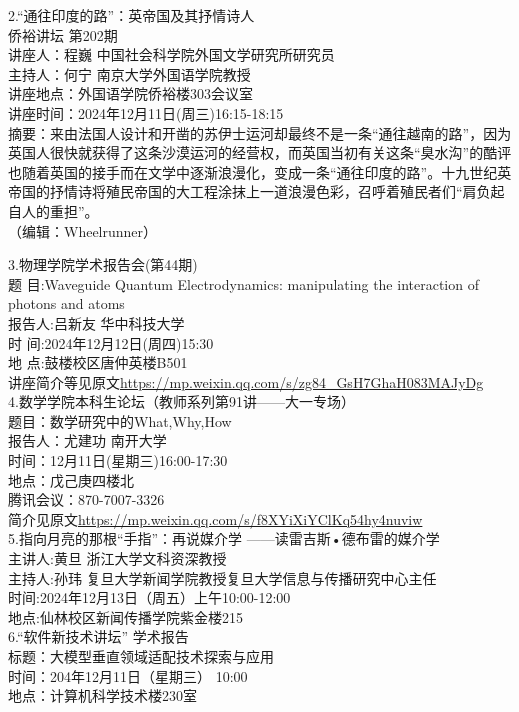 \documentclass[letterpaper, 12pt]{article}
\begin{document}
\begin{multicols}{2}
2.“通往印度的路”：英帝国及其抒情诗人\\
侨裕讲坛 第202期\\
讲座人：程巍 中国社会科学院外国文学研究所研究员\\
主持人：何宁 南京大学外国语学院教授\\
讲座地点：外国语学院侨裕楼303会议室\\
讲座时间：2024年12月11日(周三)16:15-18:15\\
摘要：来由法国人设计和开凿的苏伊士运河却最终不是一条“通往越南的路”，因为英国人很快就获得了这条沙漠运河的经营权，而英国当初有关这条“臭水沟”的酷评也随着英国的接手而在文学中逐渐浪漫化，变成一条“通往印度的路”。十九世纪英帝国的抒情诗将殖民帝国的大工程涂抹上一道浪漫色彩，召呼着殖民者们“肩负起自人的重担”。\\
（编辑：Wheelrunner）

3.物理学院学术报告会(第44期)\\
题 目:Waveguide Quantum Electrodynamics: manipulating the interaction of photons and atoms\\
报告人:吕新友 华中科技大学\\
时 间:2024年12月12日(周四)15:30\\
地 点:鼓楼校区唐仲英楼B501\\
讲座简介等见原文\url{https://mp.weixin.qq.com/s/zg84_GsH7GhaH083MAJyDg}\\

4.数学学院本科生论坛（教师系列第91讲——大一专场）\\
题目：数学研究中的What,Why,How\\
报告人：尤建功 南开大学\\
时间：12月11日(星期三)16:00-17:30\\
地点：戊己庚四楼北\\
腾讯会议：870-7007-3326\\
简介见原文\url{https://mp.weixin.qq.com/s/f8XYiXiYClKq54hy4nuviw}\\

5.指向月亮的那根“手指”：再说媒介学 ——读雷吉斯•德布雷的媒介学\\
主讲人:黄旦 浙江大学文科资深教授\\
主持人:孙玮 复旦大学新闻学院教授复旦大学信息与传播研究中心主任\\
时间:2024年12月13日（周五）上午10:00-12:00\\
地点:仙林校区新闻传播学院紫金楼215\\

6.“软件新技术讲坛” 学术报告\\
标题：大模型垂直领域适配技术探索与应用\\
时间：204年12月11日（星期三） 10:00\\
地点：计算机科学技术楼230室\\


\end{multicols}
\end{document}
